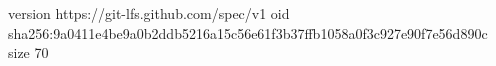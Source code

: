 version https://git-lfs.github.com/spec/v1
oid sha256:9a0411e4be9a0b2ddb5216a15c56e61f3b37ffb1058a0f3c927e90f7e56d890c
size 70
